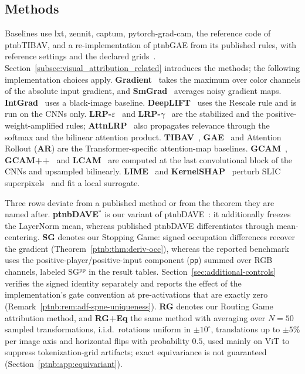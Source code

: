 \subsection{Methods}\label{ptnb:app:baselines}\label{app:baselines}

Baselines use lxt, zennit, captum, pytorch-grad-cam, the reference code of \acs{ptnbTIBAV}, and a re-\hspace{0pt}implementation of \acs{ptnbGAE} from its published rules, with reference settings and the declared grids~\parencite{Achtibat2024AttnLRP,Anders2021Zennit,kokhlikyan2020captum,Gildenblat2021gradcam,Chefer2021GenericAttention,Chefer2021ICCV}. Section~\ref{subsec:visual_attribution_related} introduces the methods; the following implementation choices apply. \textbf{Gradient}~\parencite{Simonyan2014} takes the maximum over color channels of the absolute input gradient, and \textbf{SmGrad}~\parencite{Smilkov2017} averages noisy gradient maps. \textbf{IntGrad}~\parencite{Sundararajan2017} uses a black-image baseline. \textbf{DeepLIFT}~\parencite{Shrikumar2017} uses the Rescale rule and is run on the CNNs only. \textbf{LRP-$\varepsilon$}~\parencite{Bach2015} and \textbf{LRP-$\gamma$}~\parencite{Montavon_2022_gammaLRP} are the stabilized and the positive-weight-amplified rules; \textbf{AttnLRP}~\parencite{Achtibat2024AttnLRP} also propagates relevance through the softmax and the bilinear attention product. \textbf{TIBAV}~\parencite{Chefer2021GenericAttention}, \textbf{GAE}~\parencite{Chefer2021ICCV} and Attention Rollout (\textbf{AR}) are the Transformer-specific attention-map baselines. \textbf{GCAM}~\parencite{Selvaraju2017}, \textbf{GCAM++}~\parencite{Chattopadhay2018} and \textbf{LCAM}~\parencite{Jiang2021LayerCAM} are computed at the last convolutional block of the CNNs and upsampled bilinearly. \textbf{LIME}~\parencite{Ribeiro2016} and \textbf{KernelSHAP}~\parencite{LundbergLee2017} perturb SLIC superpixels~\parencite{Achanta2012slic} and fit a local surrogate.

Three rows deviate from a published method or from the theorem they are named after. \textbf{\acs{ptnbDAVE}$^{*}$} is our variant of \ac{ptnbDAVE}~\parencite{Wrobel2024}: it additionally freezes the LayerNorm mean, whereas published \ac{ptnbDAVE} differentiates through mean-centering. \textbf{SG} denotes our Stopping Game: signed occupation differences recover the gradient (Theorem~\ref{ptnb:thm:deriv-occ}), whereas the reported benchmark uses the positive-player/positive-input component (\texttt{pp}) summed over RGB channels, labeled SG$^{\mathrm{pp}}$ in the result tables. Section~\ref{sec:additional-controls} verifies the signed identity separately and reports the effect of the implementation's gate convention at pre-activations that are exactly zero (Remark~\ref{ptnb:rem:adf-spne-uniqueness}). \textbf{RG} denotes our Routing Game attribution method, and \textbf{RG+Eq} the same method with averaging over $N=50$ sampled transformations, i.i.d.\ rotations uniform in $\pm10^\circ$, translations up to $\pm5\%$ per image axis and horizontal flips with probability $0.5$, used mainly on ViT to suppress tokenization-grid artifacts; exact equivariance is not guaranteed (Section~\ref{ptnb:app:equivariant}).

